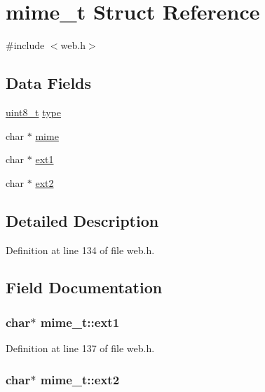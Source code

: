 \hypertarget{structmime__t}{\section{mime\-\_\-t Struct Reference}
\label{structmime__t}
}


{\ttfamily \#include $<$web.\-h$>$}

\subsection*{Data Fields}
\begin{DoxyCompactItemize}
\item 
\hyperlink{send_8c_aba7bc1797add20fe3efdf37ced1182c5}{uint8\-\_\-t} \hyperlink{structmime__t_ae69826dcfd475d65fa0fe8a1574bb3af}{type}
\item 
char $\ast$ \hyperlink{structmime__t_ad796d16eaee60d7435bff66b2e9b8a8d}{mime}
\item 
char $\ast$ \hyperlink{structmime__t_a22af12abb536a48d3425a3a4d1cce2a4}{ext1}
\item 
char $\ast$ \hyperlink{structmime__t_ae16e9342ecd4df97a2564658f1f506b1}{ext2}
\end{DoxyCompactItemize}


\subsection{Detailed Description}


Definition at line 134 of file web.\-h.



\subsection{Field Documentation}
\hypertarget{structmime__t_a22af12abb536a48d3425a3a4d1cce2a4}{
\subsubsection[{ext1}]{\setlength{\rightskip}{0pt plus 5cm}char$\ast$ mime\-\_\-t\-::ext1}}\label{structmime__t_a22af12abb536a48d3425a3a4d1cce2a4}


Definition at line 137 of file web.\-h.

\hypertarget{structmime__t_ae16e9342ecd4df97a2564658f1f506b1}{
\subsubsection[{ext2}]{\setlength{\rightskip}{0pt plus 5cm}char$\ast$ mime\-\_\-t\-::ext2}}\label{structmime__t_ae16e9342ecd4df97a2564658f1f506b1}


